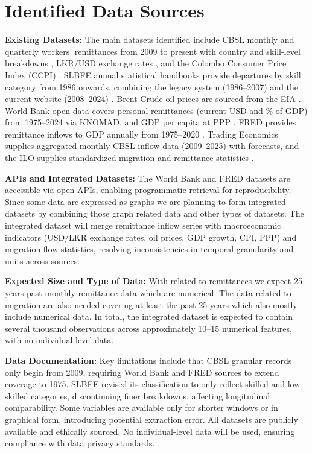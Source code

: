 \documentclass[sigconf]{acmart}
\begin{document}
\section{Identified Data Sources}

\textbf{Existing Datasets:} The main datasets identified include CBSL monthly and quarterly workers' remittances from 2009 to present with country and skill-level breakdowns \cite{worldbank-remittances}, LKR/USD exchange rates \cite{cbsl-exchangerate}, and the Colombo Consumer Price Index (CCPI) \cite{ccpi}. SLBFE annual statistical handbooks provide departures by skill category from 1986 onwards, combining the legacy system (1986--2007) and the current website (2008--2024) \cite{slbfe}. Brent Crude oil prices are sourced from the EIA \cite{eia-oil}. World Bank open data covers personal remittances (current USD and \% of GDP) from 1975--2024 via KNOMAD, and GDP per capita at PPP \cite{worldbank-ppp}. FRED provides remittance inflows to GDP annually from 1975--2020 \cite{fred-remittances}. Trading Economics supplies aggregated monthly CBSL inflow data (2009--2025) with forecasts, and the ILO supplies standardized migration and remittance statistics \cite{ilo-migration}.

\textbf{APIs and Integrated Datasets:} The World Bank and FRED datasets are accessible via open APIs, enabling programmatic retrieval for reproducibility. Since some data are expressed as graphs we are planning to form integrated datasets by combining those graph related data and other types of datasets. The integrated dataset will merge remittance inflow series with macroeconomic indicators (USD/LKR exchange rates, oil prices, GDP growth, CPI, PPP) and migration flow statistics, resolving inconsistencies in temporal granularity and units across sources.

\textbf{Expected Size and Type of Data:} With related to remittances we expect 25 years past monthly remittance data which are numerical. The data related to migration are also needed covering at least the past 25 years which also mostly include numerical data. In total, the integrated dataset is expected to contain several thousand observations across approximately 10--15 numerical features, with no individual-level data.

\textbf{Data Documentation:} Key limitations include that CBSL granular records only begin from 2009, requiring World Bank and FRED sources to extend coverage to 1975. SLBFE revised its classification to only reflect skilled and low-skilled categories, discontinuing finer breakdowns, affecting longitudinal comparability. Some variables are available only for shorter windows or in graphical form, introducing potential extraction error. All datasets are publicly available and ethically sourced. No individual-level data will be used, ensuring compliance with data privacy standards.
\end{document}
